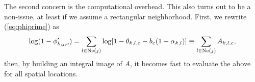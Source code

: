 \documentclass{article}
\begin{document}
The second concern is the computational overhead. This also turns out to be a non-issue, at least if we assume a rectangular neighborhood. First, we rewrite (\ref{eq:phiprime}) as 
\[
    \log(1 - \phi'_{k,j,e}) = \sum_{l \in \text{Ne}(j)} \log [1 - \theta_{k,l,e} - b_e (1 - \alpha_{k,l})] \equiv \sum_{l \in \text{Ne}(j)} A_{k,l,e},
\]
then, by building an integral image of $A$, it becomes fast to evaluate the above for all spatial locations.







\end{document}
